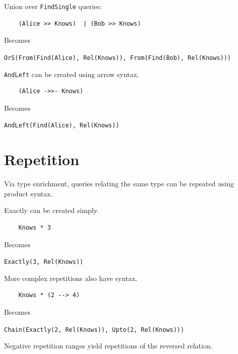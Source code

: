 \documentclass[12pt,a4paper,twoside,openright]{report}
\newcommand\codeName[1]{\texttt{#1}}
\renewcommand{\baselinestretch}{1.1}    %
\begin{document}
\begin{framed}
Union over \codeName{FindSingle} queries: 
\begin{framed}
\begin{verbatim}
 	(Alice >> Knows)  | (Bob >> Knows)
\end{verbatim}
\end{framed}
Becomes
\begin{framed}
\codeName{OrS(From(Find(Alice), Rel(Knows)), From(Find(Bob), Rel(Knows)))}
\end{framed}
\end{framed}

\begin{framed}
\codeName{AndLeft} can be created using arrow syntax.
\begin{framed}
\begin{verbatim}
 	(Alice ->>- Knows)
\end{verbatim}
\end{framed}
Becomes
\begin{framed}
\codeName{AndLeft(Find(Alice), Rel(Knows))}
\end{framed}
\end{framed}

\renewcommand{\baselinestretch}{1.1}

\section{Repetition}
Via type enrichment, queries relating the same type can be repeated using product syntax.


\renewcommand{\baselinestretch}{0.8}
\begin{framed}
Exactly can be created simply.
\begin{framed}
\begin{verbatim}
 	Knows * 3
\end{verbatim}
\end{framed}
Becomes
\begin{framed}
\codeName{Exactly(3, Rel(Knows))}
\end{framed}
\end{framed}


\begin{framed}
More complex repetitions also have syntax.
\begin{framed}
\begin{verbatim}
 	Knows * (2 --> 4)
\end{verbatim}
\end{framed}
Becomes
\begin{framed}
\codeName{Chain(Exactly(2, Rel(Knows)), Upto(2, Rel(Knows)))}
\end{framed}
\end{framed}
\renewcommand{\baselinestretch}{1.1}
Negative repetition ranges yield repetitions of the reversed relation.
\end{document}
